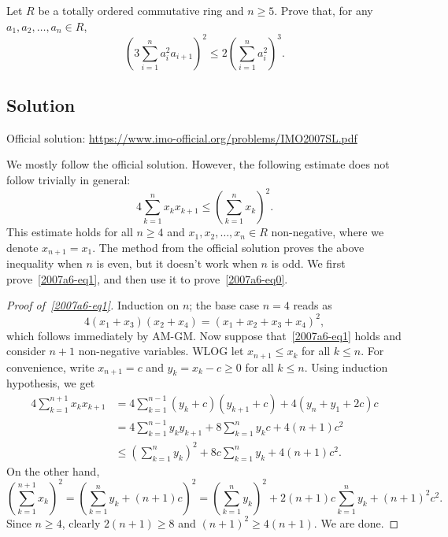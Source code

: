 Let $R$ be a totally ordered commutative ring and $n \geq 5$.
Prove that, for any $a_1, a_2, \ldots, a_n \in R$,
\[ \left(3 \sum_{i = 1}^n a_i^2 a_{i + 1}\right)^2 \leq 2 \left(\sum_{i = 1}^n a_i^2\right)^3. \tag{*}\label{2007a6-eq0} \]



\subsection*{Solution}

Official solution: \url{https://www.imo-official.org/problems/IMO2007SL.pdf}

We mostly follow the official solution.
However, the following estimate does not follow trivially in general:
\[ 4 \sum_{k = 1}^n x_k x_{k + 1} \leq \left(\sum_{k = 1}^n x_k\right)^2. \tag{1}\label{2007a6-eq1} \]
This estimate holds for all $n \geq 4$ and $x_1, x_2, \ldots, x_n \in R$ non-negative, where we denote $x_{n + 1} = x_1$.
The method from the official solution proves the above inequality when $n$ is even, but it doesn't work when $n$ is odd.
We first prove~\eqref{2007a6-eq1}, and then use it to prove~\eqref{2007a6-eq0}.

\begin{proof}[Proof of~\eqref{2007a6-eq1}]
Induction on $n$; the base case $n = 4$ reads as
\[ 4 (x_1 + x_3)(x_2 + x_4) = (x_1 + x_2 + x_3 + x_4)^2, \]
    which follows immediately by AM-GM.
Now suppose that~\eqref{2007a6-eq1} holds and consider $n + 1$ non-negative variables.
WLOG let $x_{n + 1} \leq x_k$ for all $k \leq n$.
For convenience, write $x_{n + 1} = c$ and $y_k = x_k - c \geq 0$ for all $k \leq n$.
Using induction hypothesis, we get
\begin{align*}
    4 \sum_{k = 1}^{n + 1} x_k x_{k + 1}
    &= 4 \sum_{k = 1}^{n - 1} (y_k + c)(y_{k + 1} + c) + 4 (y_n + y_1 + 2c) c \\
    &= 4 \sum_{k = 1}^{n - 1} y_k y_{k + 1} + 8 \sum_{k = 1}^n y_k c + 4 (n + 1) c^2 \\
    &\leq \left(\sum_{k = 1}^n y_k\right)^2 + 8c \sum_{k = 1}^n y_k + 4 (n + 1) c^2.
\end{align*}
On the other hand,
\[ \left(\sum_{k = 1}^{n + 1} x_k\right)^2 = \left(\sum_{k = 1}^n y_k + (n + 1) c\right)^2
    = \left(\sum_{k = 1}^n y_k\right)^2 + 2 (n + 1) c \sum_{k = 1}^n y_k + (n + 1)^2 c^2. \]
Since $n \geq 4$, clearly $2(n + 1) \geq 8$ and $(n + 1)^2 \geq 4(n + 1)$.
We are done.
\end{proof}

